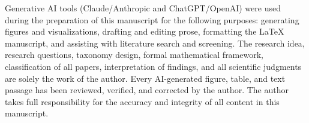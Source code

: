 \documentclass[11pt,a4paper]{article}
\begin{document}
Generative AI tools (Claude/Anthropic and ChatGPT/OpenAI) were used during the preparation of this manuscript for the following purposes: generating figures and visualizations, drafting and editing prose, formatting the LaTeX manuscript, and assisting with literature search and screening. The research idea, research questions, taxonomy design, formal mathematical framework, classification of all papers, interpretation of findings, and all scientific judgments are solely the work of the author. Every AI-generated figure, table, and text passage has been reviewed, verified, and corrected by the author. The author takes full responsibility for the accuracy and integrity of all content in this manuscript.
\end{document}

